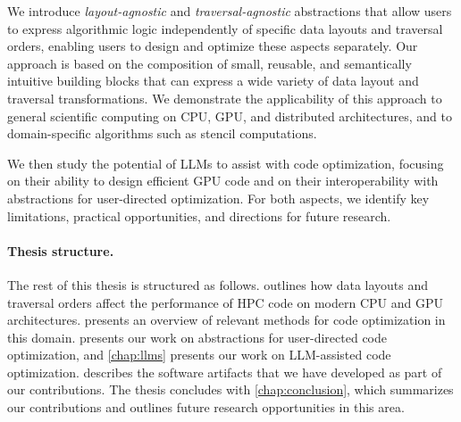 We introduce \emph{layout-agnostic} and \emph{traversal-agnostic} abstractions that allow users to express algorithmic logic independently of specific data layouts and traversal orders, enabling users to design and optimize these aspects separately.
Our approach is based on the composition of small, reusable, and semantically intuitive building blocks that can express a wide variety of data layout and traversal transformations. We demonstrate the applicability of this approach to general scientific computing on CPU, GPU, and distributed architectures, and to domain-specific algorithms such as stencil computations.

We then study the potential of LLMs to assist with code optimization, focusing on their ability to design efficient GPU code and on their interoperability with abstractions for user-directed optimization. For both aspects, we identify key limitations, practical opportunities, and directions for future research.

\paragraph{Thesis structure.} The rest of this thesis is structured as follows.  outlines how data layouts and traversal orders affect the performance of HPC code on modern CPU and GPU architectures.  presents an overview of relevant methods for code optimization in this domain.  presents our work on abstractions for user-directed code optimization, and \cref{chap:llms} presents our work on LLM-assisted code optimization.  describes the software artifacts that we have developed as part of our contributions. The thesis concludes with \cref{chap:conclusion}, which summarizes our contributions and outlines future research opportunities in this area.
